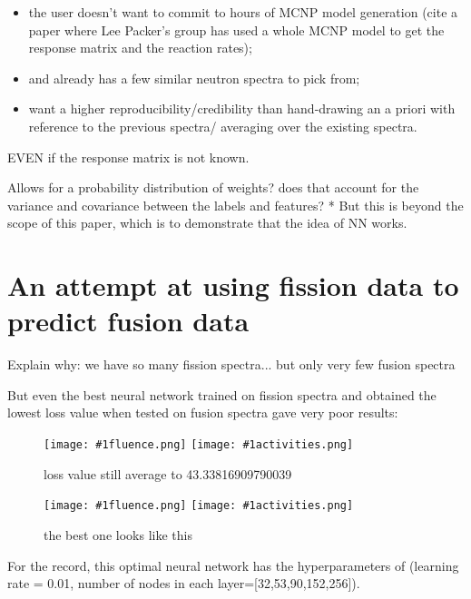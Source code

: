 \documentclass[a4paper, 12pt]{article}
\newcommand{\fluenceandactivities}[1]{
\texttt{[image: \#1fluence.png]}
\texttt{[image: \#1activities.png]}
}
\begin{document}
\begin{itemize}
    \item the user doesn't want to commit to hours of MCNP model generation (cite a paper where Lee Packer's group has used a whole MCNP model to get the response matrix and the reaction rates);
    \item and already has a few similar neutron spectra to pick from;
    \item want a higher reproducibility/credibility than hand-drawing an a priori with reference to the previous spectra/ averaging over the existing spectra.
\end{itemize}

EVEN if the response matrix is not known.

Allows for a probability distribution of weights? does that account for the variance and covariance between the labels and features? *
But this is beyond the scope of this paper, which is to demonstrate that the idea of NN works.

\section{An attempt at using fission data to predict fusion data}
Explain why: we have so many fission spectra... but only very few fusion spectra

But even the best neural network trained on fission spectra and obtained the lowest loss value when tested on fusion spectra gave very poor results:
\begin{figure}
\centering
\fluenceandactivities{/home/ocean/Documents/GitHubDir/unfolding/unfolding/unfoldingsuite/neuralnetwork/realoutputEarlyStopping/SelectedNNreplicated/fission-fusion/0918_0325_5_layer_test_mse_1_test_016_}
\caption{loss value still average to 43.33816909790039} \label{fission-fusionBad}
\end{figure}

\begin{figure}
\centering
\fluenceandactivities{/home/ocean/Documents/GitHubDir/unfolding/unfolding/unfoldingsuite/neuralnetwork/realoutputEarlyStopping/SelectedNNreplicated/fission-fusion/0918_0325_5_layer_test_mse_1_test_006_}
\caption{the best one looks like this}\label{fission-fusionGood}
\end{figure}

For the record, this optimal neural network has the hyperparameters of (learning rate = 0.01, number of nodes in each layer=[32,53,90,152,256]).
\end{document}
